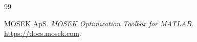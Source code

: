 \documentclass[11pt]{article}
\begin{document}
\begin{thebibliography}{99}

MOSEK ApS.
\newblock \emph{MOSEK Optimization Toolbox for MATLAB}.
\newblock \url{https://docs.mosek.com}.
\end{thebibliography}
\end{document}
